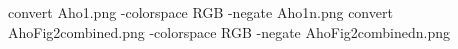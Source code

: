 convert Aho1.png -colorspace RGB -negate Aho1n.png
convert AhoFig2combined.png -colorspace RGB -negate AhoFig2combinedn.png
